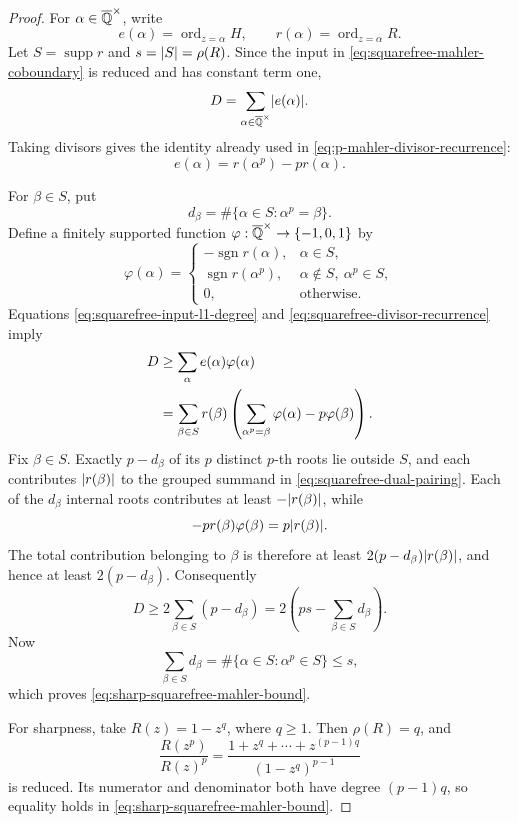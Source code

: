 \begin{proof}
For \(\alpha\in\overline{\mathbb{Q}}^{\times}\), write
\[
 e(\alpha)=\operatorname{ord}_{z=\alpha}H,
 \qquad
 r(\alpha)=\operatorname{ord}_{z=\alpha}R.
\]
Let \(S=\operatorname{supp}r\) and \(s=\lvert S \rvert=\rho(R)\).  Since the input
in \eqref{eq:squarefree-mahler-coboundary} is reduced and has constant term
one,
\begin{equation}\label{eq:squarefree-input-l1-degree}
 D=\sum_{\alpha\in\overline{\mathbb{Q}}^{\times}}\lvert e(\alpha) \rvert.
\end{equation}
Taking divisors gives the identity already used in
\eqref{eq:p-mahler-divisor-recurrence}:
\begin{equation}\label{eq:squarefree-divisor-recurrence}
 e(\alpha)=r(\alpha^p)-p r(\alpha).
\end{equation}

For \(\beta\in S\), put
\[
 d_\beta=\#\{\alpha\in S:\alpha^p=\beta\}.
\]
Define a finitely supported function
\(\varphi:\overline{\mathbb{Q}}^{\times}\to\{-1,0,1\}\) by
\[
 \varphi(\alpha)=
 \begin{cases}
  -\operatorname{sgn}r(\alpha),&\alpha\in S,\\
  \operatorname{sgn}r(\alpha^p),&\alpha\notin S,
       \ \alpha^p\in S,\\
  0,&\text{otherwise}.
 \end{cases}
\]
Equations \eqref{eq:squarefree-input-l1-degree} and
\eqref{eq:squarefree-divisor-recurrence} imply
\begin{align}
 D
 &\ge \sum_\alpha e(\alpha)\varphi(\alpha)\notag\\
 &=\sum_{\beta\in S}r(\beta)
   \left(\sum_{\alpha^p=\beta}\varphi(\alpha)-p\varphi(\beta)\right).
 \label{eq:squarefree-dual-pairing}
\end{align}
Fix \(\beta\in S\).  Exactly \(p-d_\beta\) of its \(p\) distinct
\(p\)-th roots lie outside \(S\), and each contributes
\(\lvert r(\beta) \rvert\) to the grouped summand in
\eqref{eq:squarefree-dual-pairing}.  Each of the \(d_\beta\) internal roots
contributes at least \(-\lvert r(\beta) \rvert\), while
\[
 -p r(\beta)\varphi(\beta)=p\lvert r(\beta) \rvert.
\]
The total contribution belonging to \(\beta\) is therefore at least
\(2(p-d_\beta)\lvert r(\beta) \rvert\), and hence at least
\(2(p-d_\beta)\).  Consequently
\[
 D\ge2\sum_{\beta\in S}(p-d_\beta)
 =2\left(ps-\sum_{\beta\in S}d_\beta\right).
\]
Now
\[
 \sum_{\beta\in S}d_\beta
 =\#\{\alpha\in S:\alpha^p\in S\}\le s,
\]
which proves \eqref{eq:sharp-squarefree-mahler-bound}.

For sharpness, take \(R(z)=1-z^q\), where \(q\ge1\).  Then
\(\rho(R)=q\), and
\[
 \frac{R(z^p)}{R(z)^p}
 =\frac{1+z^q+\cdots+z^{(p-1)q}}{(1-z^q)^{p-1}}
\]
is reduced.  Its numerator and denominator both have degree
\((p-1)q\), so equality holds in
\eqref{eq:sharp-squarefree-mahler-bound}.
\end{proof}

